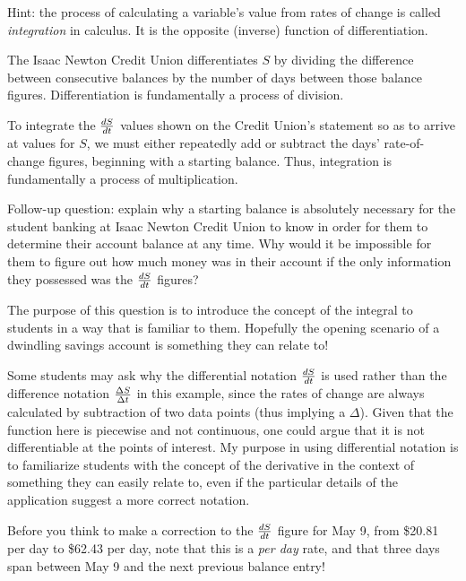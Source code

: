 Hint: the process of calculating a variable's value from rates of change is called {\it integration} in calculus.  It is the opposite (inverse) function of differentiation.







The Isaac Newton Credit Union differentiates $S$ by dividing the difference between consecutive balances by the number of days between those balance figures.  Differentiation is fundamentally a process of division.

To integrate the $dS\over dt$ values shown on the Credit Union's statement so as to arrive at values for $S$, we must either repeatedly add or subtract the days' rate-of-change figures, beginning with a starting balance.  Thus, integration is fundamentally a process of multiplication.

\vskip 10pt

Follow-up question: explain why a starting balance is absolutely necessary for the student banking at Isaac Newton Credit Union to know in order for them to determine their account balance at any time.  Why would it be impossible for them to figure out how much money was in their account if the only information they possessed was the $dS \over dt$ figures?







The purpose of this question is to introduce the concept of the integral to students in a way that is familiar to them.  Hopefully the opening scenario of a dwindling savings account is something they can relate to!

Some students may ask why the differential notation $dS \over dt$ is used rather than the difference notation $\Delta S \over \Delta t$ in this example, since the rates of change are always calculated by subtraction of two data points (thus implying a $\Delta$).  Given that the function here is piecewise and not continuous, one could argue that it is not differentiable at the points of interest.  My purpose in using differential notation is to familiarize students with the concept of the derivative in the context of something they can easily relate to, even if the particular details of the application suggest a more correct notation.

Before you think to make a correction to the $dS \over dt$ figure for May 9, from \$20.81 per day to \$62.43 per day, note that this is a {\it per day} rate, and that three days span between May 9 and the next previous balance entry!




